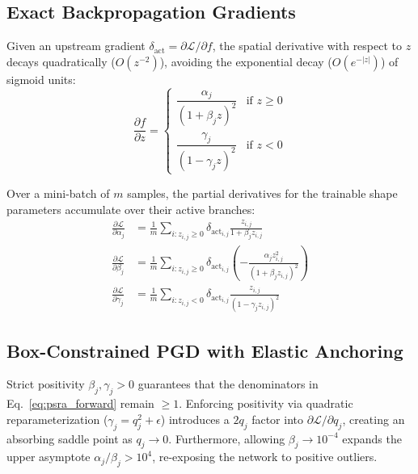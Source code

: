 \documentclass[conference]{IEEEtran}
\begin{document}
\subsection{Exact Backpropagation Gradients}
Given an upstream gradient $\delta_{\text{act}} = \partial \mathcal{L} / \partial f$, the spatial derivative with respect to $z$ decays quadratically ($O(z^{-2})$), avoiding the exponential decay ($O(e^{-|z|})$) of sigmoid units:
\begin{equation}
\frac{\partial f}{\partial z} = 
\begin{cases} 
\dfrac{\alpha_j}{(1 + \beta_j z)^2} & \text{if } z \ge 0 \\[12pt]
\dfrac{\gamma_j}{(1 - \gamma_j z)^2} & \text{if } z < 0
\end{cases}
\label{eq:psra_dz}
\end{equation}

Over a mini-batch of $m$ samples, the partial derivatives for the trainable shape parameters accumulate over their active branches:
\begin{align}
\frac{\partial \mathcal{L}}{\partial \alpha_j} &= \frac{1}{m} \sum_{i : z_{i,j} \ge 0} \delta_{\text{act}_{i,j}} \frac{z_{i,j}}{1 + \beta_j z_{i,j}} \\
\frac{\partial \mathcal{L}}{\partial \beta_j} &= \frac{1}{m} \sum_{i : z_{i,j} \ge 0} \delta_{\text{act}_{i,j}} \left( -\frac{\alpha_j z_{i,j}^2}{(1 + \beta_j z_{i,j})^2} \right) \\
\frac{\partial \mathcal{L}}{\partial \gamma_j} &= \frac{1}{m} \sum_{i : z_{i,j} < 0} \delta_{\text{act}_{i,j}} \frac{z_{i,j}}{(1 - \gamma_j z_{i,j})^2}
\end{align}

\subsection{Box-Constrained PGD with Elastic Anchoring}
Strict positivity $\beta_j, \gamma_j > 0$ guarantees that the denominators in Eq.~\eqref{eq:psra_forward} remain $\ge 1$. Enforcing positivity via quadratic reparameterization ($\gamma_j = q_j^2 + \epsilon$) introduces a $2q_j$ factor into $\partial \mathcal{L}/\partial q_j$, creating an absorbing saddle point as $q_j \to 0$. Furthermore, allowing $\beta_j \to 10^{-4}$ expands the upper asymptote $\alpha_j/\beta_j > 10^4$, re-exposing the network to positive outliers.
\end{document}
